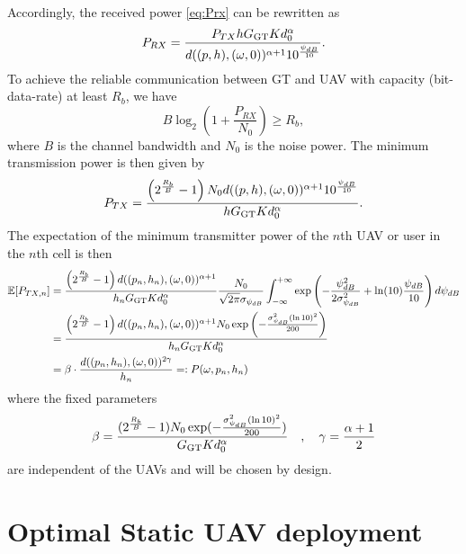 \documentclass[smallabstract,smallcaptions]{dccpaper}
\newcommand{\Rb}{\ensuremath{R_b}}         %
\newcommand{\GGT}{\ensuremath{G_{\text{GT}}}}         %
\begin{document}
%
Accordingly, the received power \eqref{eq:Prx} can be rewritten as
%
\begin{equation}
  P_{RX}=\frac{P_{TX}h \GGT K d^{\alpha}_0}{d((p,h),(\ome,0))^{\alpha+1}10^{\frac{\psi_{dB}}{10}}}.
\end{equation}
%
To achieve the reliable communication between GT and UAV with capacity (bit-data-rate) at least $\Rb$, we have
%
\begin{equation}
  B\log_2\left(1+\frac{P_{RX}}{N_0}\right)\ge\Rb,
\end{equation}
%
where $B$ is the channel bandwidth and $N_0$ is the noise power.  The minimum transmission power is then given by
%
\begin{equation}
  P_{TX}=\frac{\left(2^{\frac{\Rb}{B}}-1\right)N_0d((p,h),(\ome,0))^{\alpha+1}10^{\frac{\psi_{dB}}{10}}}{ h \GGT Kd^{\alpha}_0}.
\end{equation}
%
%
The expectation of the minimum transmitter power of the $n$th UAV or user in the $n$th cell is then
%
\begin{align}
  \Expect{P_{TX,n}}& =
  \frac{\left(2^{\frac{\Rb}{B}}-1\right) d((p_n,h_n),(\ome,0))^{\alpha+1}}{ h_n \GGT Kd^{\alpha}_0}
   \frac{N_0}{\sqrt{2\pi}\sigma_{\psi_{dB}}} \int_{-\infty}^{+\infty}
     \exp\left(-\frac{\psi^2_{dB}}{2\sigma^2_{\psi_{dB}}}+ \ln(10) \frac{\psi_{dB}}{10}\right)d\psi_{dB}\notag\\
  &=\frac{\left(2^{\frac{\Rb}{B}}-1\right)  d((p_n,h_n),(\ome,0))^{\alpha+1} N_0 \exp\left(-\frac{\sigma^2_{\psi_{dB}}(\ln{10})^2}{200}\right)}
  {h_n \GGT Kd^{\alpha}_0}\notag\\
  &=\bet \cdot  \frac{d( (p_n,h_n),(\ome,0))^{2\gam}}{h_n}=:P(\ome,p_n,h_n) \label{eq:Eptx}
\end{align}
%
where the fixed parameters
%
\begin{align}
  \bet=\frac{(2^{\frac{\Rb}{B}}-1) N_0 \exp(-\frac{\sig_{\psi_{dB}}^2 (\ln 10)^2}{200})}{\GGT K d_0^{\alp}}\quad,\quad
  \gam=\frac{\alp+1}{2}
\end{align}
%
are independent of the UAVs and will be chosen by design.



\section{Optimal Static UAV deployment}
\end{document}
